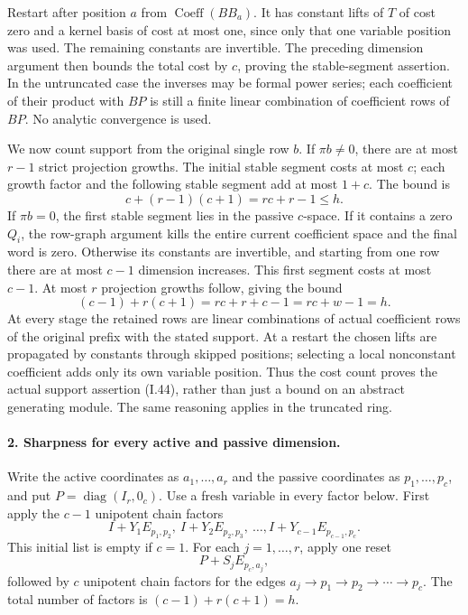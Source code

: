 Restart after position $a$ from
$\operatorname{Coeff}(BB_a)$.  It has constant lifts of $T$
of cost zero and a kernel basis of cost at most one, since
only that one variable position was used.  The remaining
constants are invertible.  The preceding dimension argument
then bounds the total cost by $c$, proving the stable-segment
assertion.  In the untruncated case the inverses may be formal
power series; each coefficient of their product with $BP$
is still a finite linear combination of coefficient rows of
$BP$.  No analytic convergence is used.

We now count support from the original single row $b$.
If $\pi b\ne0$, there are at most $r-1$ strict projection
growths.  The initial stable segment costs at most $c$;
each growth factor and the following stable segment add at
most $1+c$.  The bound is
\[
 c+(r-1)(c+1)=rc+r-1\le h.
\]
If $\pi b=0$, the first stable segment lies in the passive
$c$-space.  If it contains a zero $Q_i$, the row-graph
argument kills the entire current coefficient space and the
final word is zero.  Otherwise its constants are invertible,
and starting from one row there are at most $c-1$ dimension
increases.  This first segment costs at most $c-1$.
At most $r$ projection growths follow, giving the bound
\[
 (c-1)+r(c+1)=rc+r+c-1=rc+w-1=h.
\]
At every stage the retained rows are linear combinations of
actual coefficient rows of the original prefix with the
stated support.  At a restart the chosen lifts are propagated
by constants through skipped positions; selecting a local
nonconstant coefficient adds only its own variable position.
Thus the cost count proves the actual support assertion
(I.44), rather than just a bound on an abstract generating
module.  The same reasoning applies in the truncated ring.

\paragraph{2. Sharpness for every active and passive dimension.}
Write the active coordinates as $a_1,\ldots,a_r$ and the
passive coordinates as $p_1,\ldots,p_c$, and put
$P=\operatorname{diag}(I_r,0_c)$.
Use a fresh variable in every factor below.
First apply the $c-1$ unipotent chain factors
\[
 I+Y_1E_{p_1,p_2},\ I+Y_2E_{p_2,p_3},\ \ldots,
 I+Y_{c-1}E_{p_{c-1},p_c}.
\]
This initial list is empty if $c=1$.
For each $j=1,\ldots,r$, apply one reset
\[
 P+S_jE_{p_c,a_j},
\]
followed by $c$ unipotent chain factors for the edges
$a_j\to p_1\to p_2\to\cdots\to p_c$.
The total number of factors is
$(c-1)+r(c+1)=h$.

